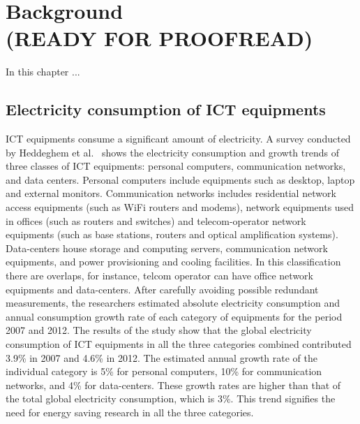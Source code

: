 \chapter{Background\\(READY FOR PROOFREAD)}
\label{chapter:background} 
In this chapter ...

\section{Electricity consumption of ICT equipments}
\label{section:ictequipment} 
ICT equipments consume a significant amount of electricity. A survey conducted by Heddeghem et al.~\cite{DBLP:journals/comcom/HeddeghemLLCPD14} shows the electricity consumption and growth trends of three classes of ICT equipments: personal computers, communication networks, and data centers. Personal computers include equipments such as desktop, laptop and external monitors. Communication networks includes residential network access equipments (such as WiFi routers and modems), network equipments used in offices (such as routers and switches) and telecom-operator network equipments (such as base stations, routers and optical amplification systems). Data-centers house storage and computing servers, communication network equipments, and power provisioning and cooling facilities.  In this classification there are overlaps, for instance, telcom operator can have office network equipments and data-centers. After carefully avoiding possible redundant measurements, the researchers estimated absolute electricity consumption and annual consumption growth rate of each category of equipments for the period 2007 and 2012. The results of the study show that the global electricity consumption of ICT equipments in all the three categories combined contributed 3.9\% in 2007 and 4.6\% in 2012. The estimated annual growth rate of the individual category is 5\% for personal computers, 10\% for communication networks, and 4\% for data-centers. These growth rates are higher than that of the total global electricity consumption, which is 3\%. This trend signifies the need for energy saving research in all the three categories.

